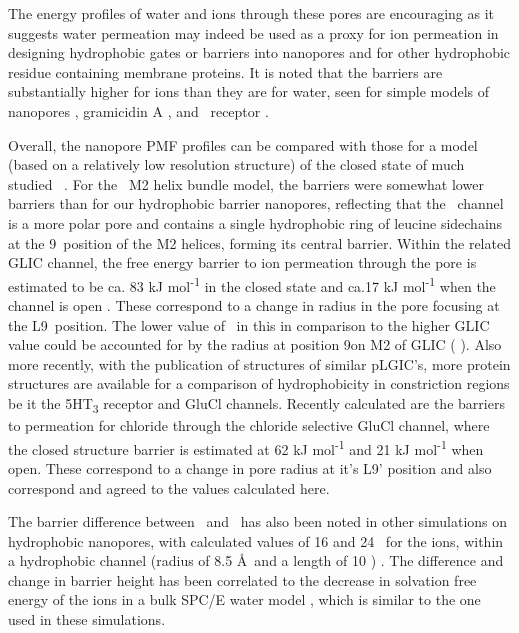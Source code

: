 The energy profiles of water and ions through these pores are encouraging as it suggests water permeation may indeed be used as a proxy for ion permeation in designing hydrophobic gates or barriers into nanopores and for other hydrophobic residue containing membrane proteins. It is noted that the barriers are substantially higher for ions than they are for water, seen for simple models of nanopores \cite{Beckstein2004a}, gramicidin A \cite{Allen2006}, and \na\ receptor \cite{Beckstein2006b}. 

Overall, the nanopore PMF profiles can be compared with those for a model (based on a relatively low resolution structure) of the closed state of much studied \na\ \cite{Beckstein2006b}. For the \na\ M2 helix bundle model, the barriers were somewhat lower barriers than for our hydrophobic barrier nanopores, reflecting that the \na\ channel is a more polar pore and contains a single hydrophobic ring of leucine sidechains at the 9\textquotesingle\ position of the M2 helices, forming its central barrier. Within the related GLIC channel, the free energy barrier to ion permeation through the pore is estimated to be ca. 83 kJ mol\textsuperscript{-1} in the closed state and  ca.17 kJ mol\textsuperscript{-1} when the channel is open \cite{Zhu2012}. These correspond to a change in radius in the pore focusing at the L9\textquotesingle\ position. The lower value of \Na\ in this in comparison to the higher GLIC value could be accounted for by the radius at position 9\textquotesingle on M2 of GLIC ( \angstrom). Also more recently, with the publication of structures of similar pLGIC's, more protein structures are available for a comparison of hydrophobicity in constriction regions be it the 5HT\textsubscript{3} receptor and GluCl channels. Recently calculated are the barriers to permeation for chloride through the chloride selective GluCl  channel, where the closed structure barrier is estimated at 62 kJ mol\textsuperscript{-1} and 21 kJ mol\textsuperscript{-1} when open. These correspond to a change in pore radius at  it's L9' position and also correspond and agreed to the values calculated here. 

The barrier difference between \Na\ and \Cl\ has also been noted in other simulations on hydrophobic nanopores, with calculated values of 16 and 24 \kj\ for the ions, within a hydrophobic channel (radius of 8.5 \AA\ and a length of 10 \angstrom) \cite{Dzubiella2005}. The difference and change in barrier height has been correlated  to the decrease in solvation free energy of the ions in a bulk SPC/E water model \cite{Lynden-Bell1996a}, which is similar to the one used in these simulations. 

